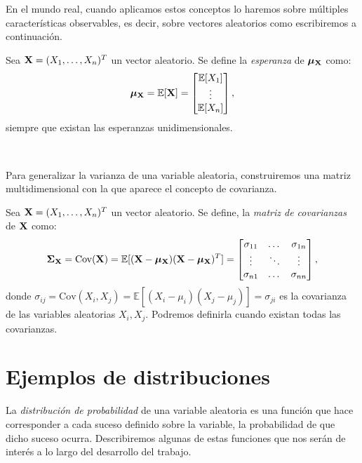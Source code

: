 \documentclass[oneside,openright,titlepage,numbers=noenddot,openany,headinclude,footinclude=true,
cleardoublepage=empty,abstractoff,BCOR=5mm,paper=a4,fontsize=12pt,main=spanish]{scrreprt}
\begin{document}
En el mundo real, cuando aplicamos estos conceptos lo haremos sobre múltiples características observables, es decir, sobre vectores aleatorios como escribiremos a continuación.\\

\begin{definition}
Sea $\textbf{X}=(X_1,\dots,X_n)^T$ un vector aleatorio. Se define la \textit{esperanza} de $\bm{\mu_{\textbf{X}}}$ como: $$\bm{\mu_{\textbf{X}}}=\mathbb{E}[\textbf{X}]=\begin{bmatrix}
\mathbb{E}[X_1]\\
\vdots\\
\mathbb{E}[X_n]
\end{bmatrix},$$
siempre que existan las esperanzas unidimensionales.
\end{definition}\

Para generalizar la varianza de una variable aleatoria, construiremos una matriz multidimensional con la que aparece el concepto de covarianza.\\

\begin{definition}
Sea $\textbf{X}=(X_1,\dots,X_n)^T$ un vector aleatorio. Se define, la \textit{matriz de covarianzas} de $\textbf{X}$ como: $$\bm{\Sigma_{\textbf{X}}} = \text{Cov}(\textbf{X})=\mathbb{E}[(\textbf{X}-\bm{\mu_{\textbf{X}}})(\textbf{X}-\bm{\mu_{\textbf{X}}})^T]=\begin{bmatrix}
\sigma_{11} & \dots & \sigma_{1n}\\
\vdots & \ddots & \vdots\\
\sigma_{n1} & \dots & \sigma_{nn}
\end{bmatrix},$$
donde $\sigma_{ij}=\text{Cov}(X_i,X_j)=\mathbb{E}[(X_i-\mu_i)(X_j-\mu_j)]=\sigma_{ji}$ es la covarianza de las variables aleatorias $X_i,X_j$. Podremos definirla cuando existan todas las covarianzas.
\end{definition}

\section{Ejemplos de distribuciones}

La \textit{distribución de probabilidad} de una variable aleatoria es una función que hace corresponder a cada suceso definido sobre la variable, la probabilidad de que dicho suceso ocurra. Describiremos algunas de estas funciones que nos serán de interés a lo largo del desarrollo del trabajo.\\
\end{document}
